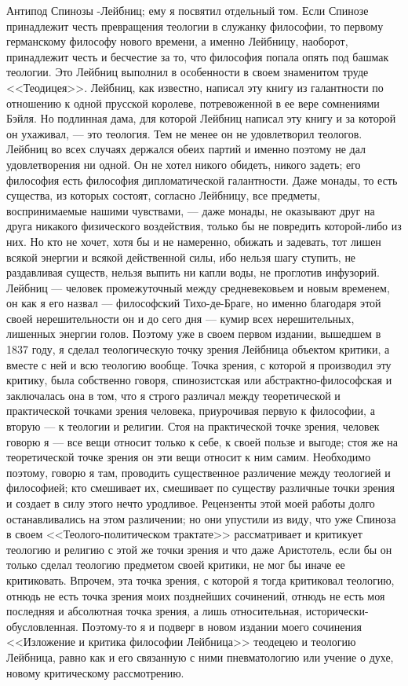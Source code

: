 \documentclass[12pt]{article}
\begin{document}
Антипод Спинозы -Лейбниц; ему я посвятил отдельный том. Если Спинозе принадлежит честь превращения теологии в служанку философии, то первому германскому философу нового времени, а именно Лейбницу, наоборот, принадлежит честь и бесчестие за то, что философия попала опять под башмак теологии. Это Лейбниц выполнил в особенности в своем знаменитом труде <<Теодицея>>. Лейбниц, как известно, написал эту книгу из галантности по отношению к одной прусской королеве, потревоженной в ее вере сомнениями Бэйля. Но подлинная дама, для которой Лейбниц написал эту книгу и за которой он ухаживал, --- это теология. Тем не менее он не удовлетворил теологов. Лейбниц во всех случаях держался обеих партий и именно поэтому не дал удовлетворения ни одной. Он не хотел никого обидеть, никого задеть; его философия есть философия дипломатической галантности. Даже монады, то есть существа, из которых состоят, согласно Лейбницу, все предметы, воспринимаемые нашими чувствами, --- даже монады, не оказывают друг на друга никакого физического воздействия, только бы не повредить которой-либо из них. Но кто не хочет, хотя бы и не намеренно, обижать и задевать, тот лишен всякой энергии и всякой действенной силы, ибо нельзя шагу ступить, не раздавливая существ, нельзя выпить ни капли воды, не проглотив инфузорий. Лейбниц --- человек промежуточный между средневековьем и новым временем, он как я его назвал --- философский Тихо-де-Браге, но именно благодаря этой своей нерешительности он и до сего дня --- кумир всех нерешительных, лишенных энергии голов. Поэтому уже в своем первом издании, вышедшем в 1837 году, я сделал теологическую точку зрения Лейбница объектом критики, а вместе с ней и всю теологию вообще. Точка зрения, с которой я производил эту критику, была собственно говоря, спинозистская или абстрактно-философская и заключалась она в том, что я строго различал между теоретической и практической точками зрения человека, приурочивая первую к философии, а вторую --- к теологии и религии. Стоя на практической точке зрения, человек говорю я --- все вещи относит только к себе, к своей пользе и выгоде; стоя же на теоретической точке зрения он эти вещи относит к ним самим. Необходимо поэтому, говорю я там, проводить существенное различение между теологией и философией; кто смешивает их, смешивает по существу различные точки зрения и создает в силу этого нечто уродливое. Рецензенты этой моей работы долго останавливались на этом различении; но они упустили из виду, что уже Спиноза в своем <<Теолого-политическом трактате>> рассматривает и критикует теологию и религию с этой же точки зрения и что даже Аристотель, если бы он только сделал теологию предметом своей критики, не мог бы иначе ее критиковать. Впрочем, эта точка зрения, с которой я тогда критиковал теологию, отнюдь не есть точка зрения моих позднейших сочинений, отнюдь не есть моя последняя и абсолютная точка зрения, а лишь относительная, исторически-обусловленная. Поэтому-то я и подверг в новом издании моего сочинения <<Изложение и критика философии Лейбница>> теодецею и теологию Лейбница, равно как и его связанную с ними пневматологию или учение о духе, новому критическому рассмотрению.
\end{document}
